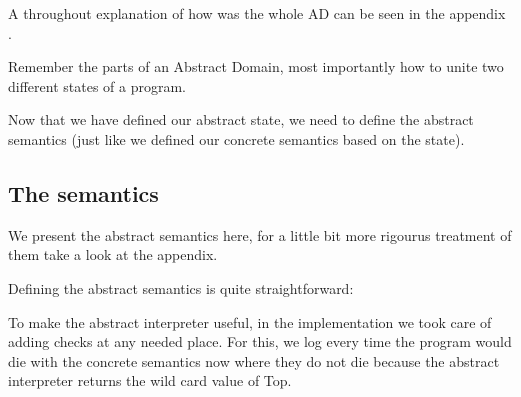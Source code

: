 A throughout explanation of how was the whole AD can be seen in the appendix .

Remember the parts of an Abstract Domain, most importantly how to unite two different
states of a program.


Now that we have defined our abstract state, we need to define the abstract semantics
(just like we defined our concrete semantics based on the state).

\subsection{The semantics}

We present the abstract semantics here, for a little bit more rigourus treatment of them
take a look at the appendix.

Defining the abstract semantics is quite straightforward:



To make the abstract interpreter useful, in the implementation we took care of adding
checks at any needed place. For this, we log every time the program would die with the
concrete semantics now where they do not die because the abstract interpreter returns the
wild card value of Top.
